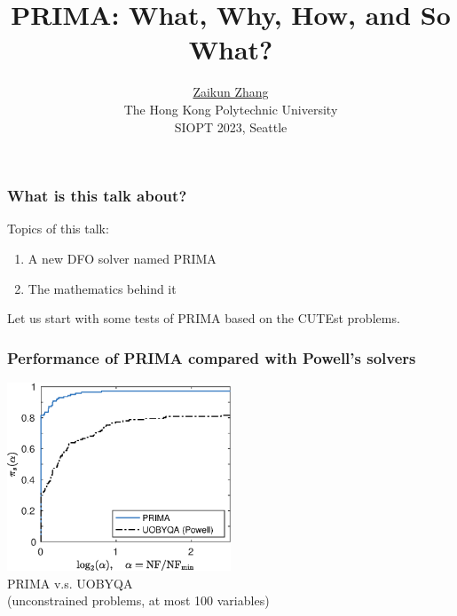 \documentclass[slidestop,mathserif,xcolor=dvipsnames]{beamer}
\title[\insertsection]
{PRIMA: What, Why, How, and So What?}
\author[]{
  {\href{https://www.zhangzk.net}{Zaikun Zhang}}
  \\[2ex]{\small The Hong Kong Polytechnic University}\\[3ex]
    {
        SIOPT 2023, Seattle
        \\[9ex]
    }%
	}
\date{}
\begin{document}
\begin{frame}[plain]
  \titlepage
\end{frame}

\begin{frame}
    \frametitle{What is this talk about?}

    \vspace{10ex}
    Topics of this talk:
    \vspace{2ex}
    \begin{enumerate}
        \item A new DFO solver named PRIMA
            \vspace{2ex}
        \item The mathematics behind it
    \end{enumerate}

    \vspace{2ex}
    Let us start with some tests of PRIMA based on the CUTEst problems.
\end{frame}


\begin{frame}
    \frametitle{Performance of PRIMA compared with Powell's solvers}
    \vspace{3ex}
    \begin{center}
    \includegraphics[width=0.5\textwidth]{prima_uobyqa.eps}
    \\[2ex]PRIMA v.s. UOBYQA \\[1ex](unconstrained problems, at most 100 variables)
    \end{center}
\end{frame}
\end{document}
